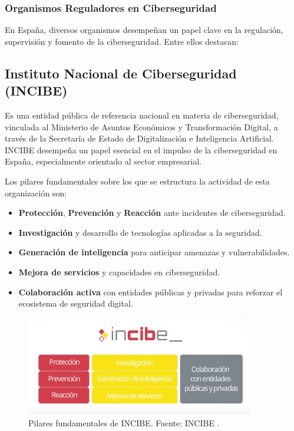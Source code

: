 \documentclass[a4paper, 11pt]{article}
\begin{document}
\subsubsection{Organismos Reguladores en Ciberseguridad}

En España, diversos organismos desempeñan un papel clave en la regulación, supervisión y fomento de la ciberseguridad. Entre ellos destacan:

\subsection*{Instituto Nacional de Ciberseguridad (INCIBE)}
 Es una entidad pública de referencia nacional en materia de ciberseguridad, vinculada al Ministerio de Asuntos Económicos 
y Transformación Digital, a través de la Secretaría de Estado de Digitalización e Inteligencia Artificial. INCIBE desempeña un papel esencial en el impulso de la 
ciberseguridad en España, especialmente orientado al sector empresarial. \cite{incibe}


Los pilares fundamentales sobre los que se estructura la actividad de esta organización son:
\begin{itemize}
\item \textbf{Protección}, \textbf{Prevención} y \textbf{Reacción} ante incidentes de ciberseguridad.
\item \textbf{Investigación} y desarrollo de tecnologías aplicadas a la seguridad.
\item \textbf{Generación de inteligencia} para anticipar amenazas y vulnerabilidades.
\item \textbf{Mejora de servicios} y capacidades en ciberseguridad.
\item \textbf{Colaboración activa} con entidades públicas y privadas para reforzar el ecosistema de seguridad digital.
\end{itemize}

\begin{figure}[H]
\centering
\includegraphics[width=10cm]{images/incibe.png}
\caption{Pilares fundamentales de INCIBE. Fuente: INCIBE \cite{incibe}.}
\label{fig:incibe-pilares}
\end{figure}
\end{document}
